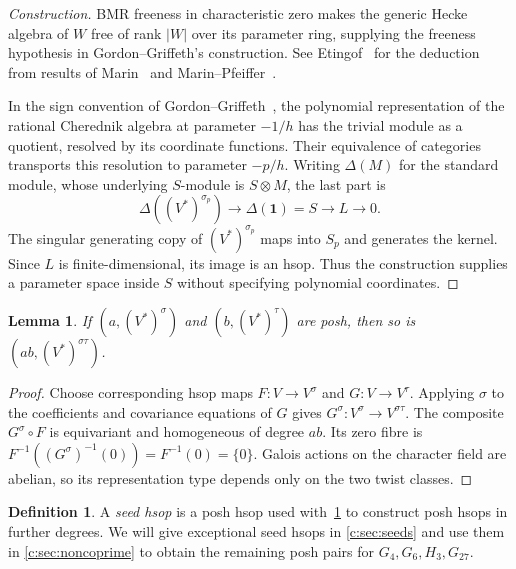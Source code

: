 \documentclass[11pt]{amsart}
\newcommand{\defn}[1]{\emph{\color{darkblue}#1}}
\newtheorem{lemma}[theorem]{Lemma}
\theoremstyle{definition}
\newtheorem{definition}[theorem]{Definition}
\begin{document}
\begin{proof}[Construction]
BMR freeness in characteristic zero makes the generic Hecke algebra
of $W$ free of rank $|W|$ over its parameter ring, supplying the
freeness hypothesis in Gordon--Griffeth's construction. See
Etingof~\cite[Theorem~1.3]{Etingof} for the deduction from results of
Marin~\cite{MarinCubic,MarinFreeness} and
Marin--Pfeiffer~\cite[Theorem~1.2]{MarinPfeiffer}.

In the sign convention of Gordon--Griffeth~\cite[Sections~2.9--2.11]{GG},
the polynomial representation of the rational Cherednik algebra at
parameter $-1/h$ has the trivial module as a quotient, resolved by
its coordinate functions. Their equivalence of categories transports
this resolution to parameter $-p/h$. Writing $\Delta(M)$ for the
standard module, whose underlying $S$-module is $S\otimes M$, the last
part is
\[
 \Delta((V^*)^{\sigma_p})\longrightarrow
 \Delta(\mathbf1)=S\longrightarrow L\longrightarrow0.
\]
The singular generating copy of $(V^*)^{\sigma_p}$ maps into $S_p$
and generates the kernel. Since $L$ is finite-dimensional, its image
is an hsop. Thus the construction supplies a parameter space inside
$S$ without specifying polynomial coordinates.
\end{proof}

\begin{lemma}\label{c:lem:composition}
If $(a,(V^*)^\sigma)$ and $(b,(V^*)^\tau)$ are posh, then so is
$(ab,(V^*)^{\sigma\tau})$.
\end{lemma}
\begin{proof}
Choose corresponding hsop maps $F:V\to V^\sigma$ and $G:V\to V^\tau$.
Applying $\sigma$ to the coefficients and covariance equations of $G$
gives $G^\sigma:V^\sigma\to V^{\sigma\tau}$. The composite
$G^\sigma\circ F$ is equivariant and homogeneous of degree $ab$.
Its zero fibre is $F^{-1}((G^\sigma)^{-1}(0))=F^{-1}(0)=\{0\}$.
Galois actions on the character field are abelian, so its representation
type depends only on the two twist classes.
\end{proof}

\begin{definition}\label{b:def:seed}
A \defn{seed hsop} is a posh hsop used with~\cref{c:lem:composition}
to construct posh hsops in further degrees. We will give exceptional seed
hsops in \cref{c:sec:seeds} and use them in \cref{c:sec:noncoprime}
to obtain the remaining posh pairs for
$G_4,G_6,H_3,G_{27}$.
\end{definition}
\end{document}
